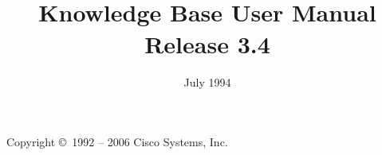 %
% 
% 
% 
% 



%
%



%
%





\title{
    {\Large \eclipse}\\
    \vspace{1cm}
    {\Huge Knowledge Base User Manual}\\
    \vspace{1cm}
    Release 3.4}
\date{July 1994}
\author{ }

\maketitle

\setcounter{page}{2}
\pagestyle{empty}


Copyright \copyright\ 1992 -- 2006 Cisco Systems, Inc.

\cleardoublepage
\pagestyle{plain}

\begin{latexonly}
\tableofcontents
\end{latexonly}

\cleardoublepage
{}

